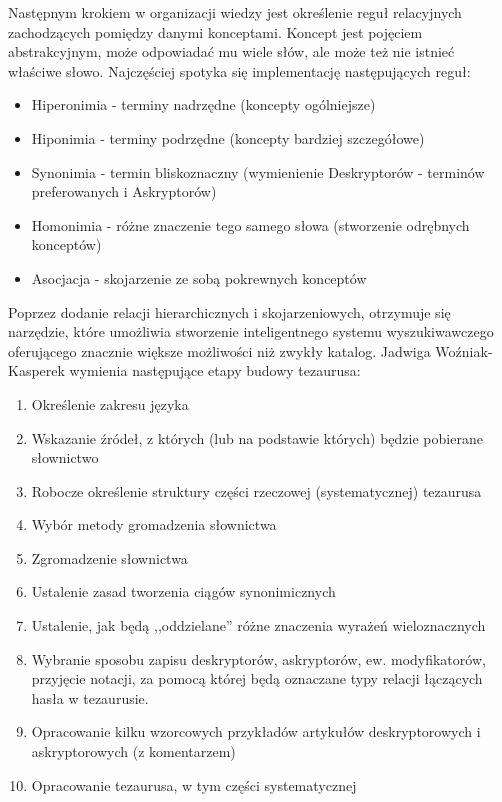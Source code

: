 \documentclass[12pt,a4paper,notitlepage]{article}
\begin{document}
Następnym krokiem w organizacji wiedzy jest określenie reguł relacyjnych zachodzących pomiędzy danymi konceptami. Koncept jest pojęciem abstrakcyjnym, może odpowiadać mu wiele słów, ale może też nie istnieć właściwe słowo. Najczęściej spotyka się implementację następujących reguł:
\begin{itemize}
   \item Hiperonimia - terminy nadrzędne (koncepty ogólniejsze)
	\item Hiponimia - terminy podrzędne (koncepty bardziej szczegółowe)
	\item Synonimia  - termin bliskoznaczny (wymienienie Deskryptorów - terminów preferowanych i Askryptorów)
	\item Homonimia - różne znaczenie tego samego słowa (stworzenie odrębnych konceptów)
	\item Asocjacja - skojarzenie ze sobą pokrewnych konceptów
\end{itemize} 
Poprzez dodanie relacji hierarchicznych i skojarzeniowych, otrzymuje się narzędzie, które umożliwia stworzenie inteligentnego systemu wyszukiwawczego oferującego znacznie większe możliwości niż zwykły katalog.   
Jadwiga Woźniak-Kasperek \cite{KasperekPoradnik} wymienia następujące etapy budowy tezaurusa: 
\begin{enumerate}
   \item Określenie zakresu języka
	\item Wskazanie  źródeł, z których (lub na podstawie których) będzie pobierane słownictwo
	\item Robocze określenie struktury części rzeczowej (systematycznej) tezaurusa 
	\item Wybór metody gromadzenia słownictwa
	\item Zgromadzenie słownictwa
	\item Ustalenie zasad tworzenia ciągów synonimicznych
	\item Ustalenie, jak będą ,,oddzielane'' różne znaczenia wyrażeń wieloznacznych
	\item Wybranie sposobu zapisu deskryptorów, askryptorów, ew. modyfikatorów, przyjęcie notacji, za pomocą której będą oznaczane 
typy relacji łączących hasła w tezaurusie.
	\item  Opracowanie kilku wzorcowych przykładów artykułów deskryptorowych i 
askryptorowych (z komentarzem)
	\item Opracowanie tezaurusa, w tym części systematycznej
\end{enumerate}
\end{document}
